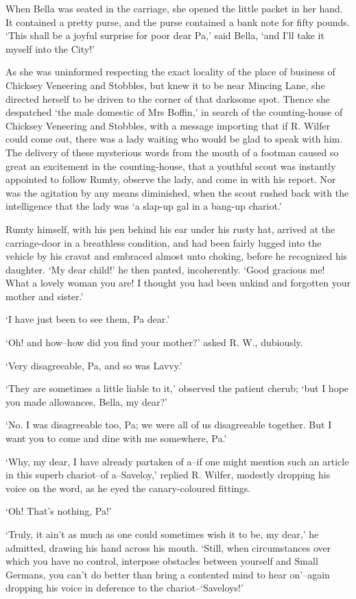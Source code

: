 When Bella was seated in the carriage, she opened the little packet in
her hand. It contained a pretty purse, and the purse contained a bank
note for fifty pounds. ‘This shall be a joyful surprise for poor dear
Pa,’ said Bella, ‘and I’ll take it myself into the City!’

As she was uninformed respecting the exact locality of the place of
business of Chicksey Veneering and Stobbles, but knew it to be near
Mincing Lane, she directed herself to be driven to the corner of that
darksome spot. Thence she despatched ‘the male domestic of Mrs Boffin,’
in search of the counting-house of Chicksey Veneering and Stobbles, with
a message importing that if R. Wilfer could come out, there was a lady
waiting who would be glad to speak with him. The delivery of these
mysterious words from the mouth of a footman caused so great an
excitement in the counting-house, that a youthful scout was instantly
appointed to follow Rumty, observe the lady, and come in with his
report. Nor was the agitation by any means diminished, when the scout
rushed back with the intelligence that the lady was ‘a slap-up gal in a
bang-up chariot.’

Rumty himself, with his pen behind his ear under his rusty hat, arrived
at the carriage-door in a breathless condition, and had been fairly
lugged into the vehicle by his cravat and embraced almost unto choking,
before he recognized his daughter. ‘My dear child!’ he then panted,
incoherently. ‘Good gracious me! What a lovely woman you are! I thought
you had been unkind and forgotten your mother and sister.’

‘I have just been to see them, Pa dear.’

‘Oh! and how--how did you find your mother?’ asked R. W., dubiously.

‘Very disagreeable, Pa, and so was Lavvy.’

‘They are sometimes a little liable to it,’ observed the patient cherub;
‘but I hope you made allowances, Bella, my dear?’

‘No. I was disagreeable too, Pa; we were all of us disagreeable
together. But I want you to come and dine with me somewhere, Pa.’

‘Why, my dear, I have already partaken of a--if one might mention such
an article in this superb chariot--of a--Saveloy,’ replied R. Wilfer,
modestly dropping his voice on the word, as he eyed the canary-coloured
fittings.

‘Oh! That’s nothing, Pa!’

‘Truly, it ain’t as much as one could sometimes wish it to be, my
dear,’ he admitted, drawing his hand across his mouth. ‘Still, when
circumstances over which you have no control, interpose obstacles
between yourself and Small Germans, you can’t do better than bring a
contented mind to hear on’--again dropping his voice in deference to the
chariot--‘Saveloys!’

